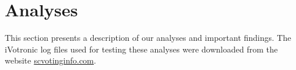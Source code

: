 \section{Analyses}
This section presents a description of our analyses and important findings.  The iVotronic log files used for testing these analyses were downloaded from the website \url{scvotinginfo.com}.






